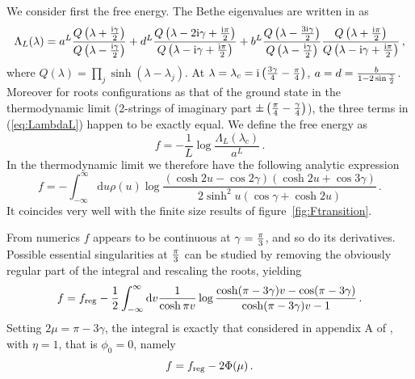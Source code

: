 \documentclass[11pt]{article}
\begin{document}
We consider first the free energy. 
The Bethe eigenvalues are written in \cite{GM2} as 
%
\begin{equation}
 \Lambda_L (\lambda)= a^L \frac{Q\left(\lambda+{ \mathrm{i}\gamma\over 2}\right)}{Q\left( \lambda-{ \mathrm{i}\gamma\over 2} \right)} 
 + d^L \frac{Q\left(\lambda-2\mathrm{i}\gamma+{ \mathrm{i}\pi\over 2}\right)}{Q\left(\lambda-\mathrm{i}\gamma+{ \mathrm{i}\pi\over 2} \right)} 
 + b^L  \frac{Q\left(\lambda-{3 \mathrm{i}\gamma\over 2}\right)}{Q\left( \lambda-{ \mathrm{i}\gamma\over 2} \right)} 
 \frac{Q\left(\lambda+{ \mathrm{i}\pi\over 2}\right)}{Q\left(\lambda-\mathrm{i}\gamma+{ \mathrm{i}\pi\over 2} \right)} \,,
\label{eq:LambdaL}
\end{equation}
%
where $Q(\lambda)=\prod_j \sinh(\lambda - \lambda_j)$.
At $\lambda = \lambda_c =\mathrm{i}\left({3\gamma \over 4}-{\pi \over 4}\right)$, $a=d={b \over 1-2\sin{\gamma \over 2}}$. 
Moreover for roots configurations as that of the ground state in the thermodynamic limit (2-strings of imaginary part $\pm \left({\pi \over 4}-{\gamma \over 4} \right)$),
the three terms in (\ref{eq:LambdaL}) happen to be exactly equal.
We define the free energy as 
%
\begin{equation}
 f = -\frac{1}{L}\log \frac{\Lambda_L(\lambda_c)}{a^L} \,.
\end{equation}
%
In the thermodynamic limit we therefore have the following analytic expression
%
\begin{equation}
 f = -\int_{-\infty}^{\infty}\mathrm{d}u\rho(u) \log \frac{\left(\cosh 2 u - \cos 2\gamma \right)\left(\cosh 2 u + \cos 3\gamma \right)}{2\sinh^2 u \left( \cos\gamma+\cosh 2u \right)} \,. \label{fetrans23}
\end{equation}
%
It coincides very well with the finite size results of figure~\ref{fig:Ftransition}.

From numerics $f$ appears to be continuous at $\gamma = {\pi \over 3}$, and so do its derivatives.
Possible essential singularities at ${\pi \over 3}$ can be studied by removing the obviously regular part of the integral and rescaling the roots, yielding
\begin{equation}
 f = f_{\rm reg} - \frac{1}{2} \int_{-\infty}^{\infty}\mathrm{d}v \frac{1}{\cosh \pi v} \log \frac{\cosh (\pi-3\gamma)v - \cos(\pi - 3\gamma)}{\cosh (\pi-3\gamma)v -1} \,.
\end{equation}
Setting $2 \mu = \pi-3\gamma$, the integral is exactly that considered in appendix A of \cite{Abraham}, with $\eta = 1$, that is $\phi_0 = 0$, namely
\begin{equation}
 f = f_{\rm reg} - 2 \Phi(\mu) \,.
\end{equation}
\end{document}
